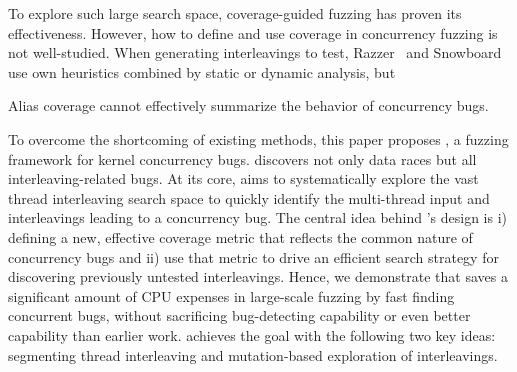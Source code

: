 
To explore such large search space, coverage-guided fuzzing 
has proven its effectiveness. 
However, how to define and use coverage in concurrency fuzzing is 
not well-studied. When generating interleavings to test,
Razzer~\cite{razzer} and Snowboard~\cite{snowboard} use own heuristics
combined by static or dynamic analysis, but 



Alias coverage cannot effectively summarize the behavior 
of concurrency bugs.


To overcome the shortcoming of existing methods, this paper proposes
\sys, a fuzzing framework for kernel concurrency bugs. 
\sys discovers not only data races but 
all interleaving-related bugs. 
At its core, \sys aims to systematically explore the vast thread
interleaving search space to quickly identify the multi-thread input and 
interleavings leading to a concurrency bug. The central idea behind \sys's design
is i) defining a new, effective coverage metric that reflects the 
common nature of concurrency bugs and ii) use that metric to drive 
an efficient search strategy for discovering previously untested interleavings.
Hence, we demonstrate that \sys saves a significant amount of CPU expenses 
in large-scale fuzzing by fast finding concurrent bugs, 
without sacrificing bug-detecting capability or even better 
capability than earlier work.
\sys achieves the goal with the following two key ideas:
segmenting thread interleaving and mutation-based exploration of interleavings.


